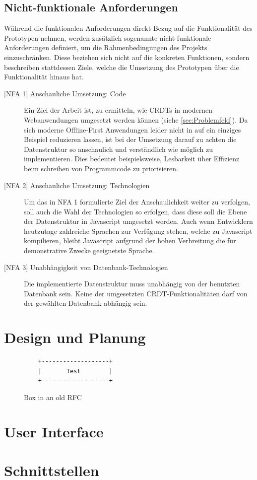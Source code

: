 \documentclass[a4paper, 12pt]{scrreprt}
\begin{document}
\subsection{Nicht-funktionale Anforderungen}
Während die funktionalen Anforderungen direkt Bezug auf die Funktionalität des Prototypen nehmen, werden zusätzlich sogenannte nicht-funktionale Anforderungen definiert, um die Rahmenbedingungen des Projekts einzuschränken. Diese beziehen sich nicht auf die konkreten Funktionen, sondern beschreiben stattdessen Ziele, welche die Umsetzung des Prototypen über die Funktionalität hinaus hat. 

\begin{description}
	\item[{[NFA 1]} Anschauliche Umsetzung: Code]
	Ein Ziel der Arbeit ist, zu ermitteln, wie CRDTs in modernen Webanwendungen umgesetzt werden können (siehe \ref{sec:Problemfeld}). Da sich moderne Offline-First Anwendungen leider nicht in auf ein einziges Beispiel reduzieren lassen, ist bei der Umsetzung darauf zu achten die Datenstruktur so anschaulich und verständlich wie möglich zu implementieren. Dies bedeutet beispielsweise, Lesbarkeit über Effizienz beim schreiben von Programmcode zu priorisieren.
	\item[{[NFA 2]} Anschauliche Umsetzung: Technologien]
	Um das in NFA 1 formulierte Ziel der Anschaulichkeit weiter zu verfolgen, soll auch die Wahl der Technologien so erfolgen, dass diese soll die Ebene der Datenstruktur in Javascript umgesetzt werden. Auch wenn Entwicklern heutzutage zahlreiche Sprachen zur Verfügung stehen, welche zu Javascript kompilieren, bleibt Javascript aufgrund der hohen Verbreitung die für demonstrative Zwecke geeignetste Sprache.
	\item[{[NFA 3]} Unabhängigkeit von Datenbank-Technologien]
	Die implementierte Datenstruktur muss unabhängig von der benutzten Datenbank sein. Keine der umgesetzten CRDT-Funktionalitäten darf von der gewählten Datenbank abhängig sein.
	
\end{description}

\section{Design und Planung}
\begin{figure}
	\begin{verbatim}
	+-------------------+
	|       Test        |
	+-------------------+
	\end{verbatim}
	\caption{Box in an old RFC}
	\label{fig:ascii-box}
\end{figure}


\section{User Interface}
\section{Schnittstellen}
\newpage
\printbibliography
\end{document}
